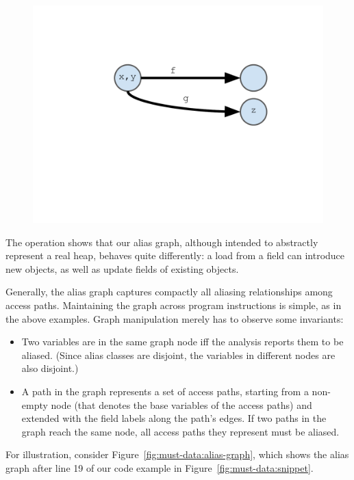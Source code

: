 \begin{figure}[ht]
\centering
\includegraphics[trim={35mm 85mm 35mm 51mm},clip,width=0.8\linewidth]{assets/must-data/alias-graph3.pdf}
\end{figure}

The  operation shows that our alias graph, although intended to abstractly represent a real heap, behaves quite differently: a load from a field can introduce new objects, as well as update fields of existing objects.

Generally, the alias graph captures compactly all aliasing relationships among access paths. Maintaining the graph across program instructions is simple, as in the above examples. Graph manipulation merely has to observe some invariants:

\begin{itemize}
\item Two variables are in the same graph node iff the analysis reports them to be aliased. (Since alias classes are disjoint, the variables in different nodes are also disjoint.)

\item A path in the graph represents a set of access paths, starting from a non-empty node (that denotes the base variables of the access paths) and extended with the field labels along the path's edges. If two paths in the graph reach the same node, all access paths they represent must be aliased.
\end{itemize}

For illustration, consider Figure~\ref{fig:must-data:alias-graph}, which shows the alias graph after line 19 of our code example in Figure~\ref{fig:must-data:snippet}.

